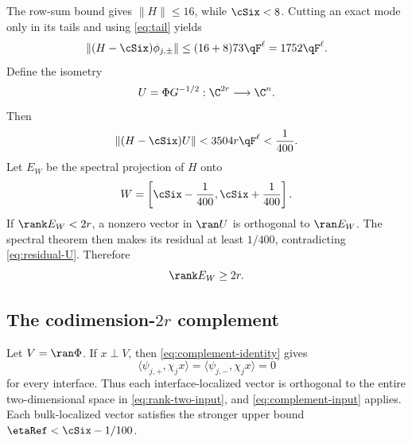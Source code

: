 The row-sum bound gives \(\|H\|\leq16\), while \(\cSix<8\).  Cutting an
exact mode only in its tails and using \eqref{eq:tail} yields
\begin{equation}
 \|(H-\cSix)\phi_{j,\pm}\|
 \leq(16+8)73\qF^\ell=1752\qF^\ell.
 \label{eq:residual-column}
\end{equation}
Define the isometry
\begin{equation}
 U=\Phi G^{-1/2}:\C^{2r}\longrightarrow\C^n.
 \label{eq:U}
\end{equation}
Then
\begin{equation}
 \|(H-\cSix)U\|<3504r\qF^\ell<\frac1{400}.
 \label{eq:residual-U}
\end{equation}
Let \(E_W\) be the spectral projection of \(H\) onto
\begin{equation}
 W=\left[\cSix-\frac1{400},\cSix+\frac1{400}\right].
 \label{eq:window}
\end{equation}
If \(\rank E_W<2r\), a nonzero vector in \(\ran U\) is orthogonal to
\(\ran E_W\).  The spectral theorem then makes its residual at least
\(1/400\), contradicting \eqref{eq:residual-U}.  Therefore
\begin{equation}
 \rank E_W\geq2r.
 \label{eq:lower-count}
\end{equation}

\subsection{The codimension-\texorpdfstring{\(2r\)}{2r} complement}

Let \(V=\ran\Phi\).  If \(x\perp V\), then
\eqref{eq:complement-identity} gives
\[
 \langle\psi_{j,+},\chi_jx\rangle
 =\langle\psi_{j,-},\chi_jx\rangle=0
\]
for every interface.  Thus each interface-localized vector is orthogonal to
the entire two-dimensional space in \eqref{eq:rank-two-input}, and
\eqref{eq:complement-input} applies.  Each bulk-localized vector satisfies
the stronger upper bound \(\etaRef<\cSix-1/100\).


